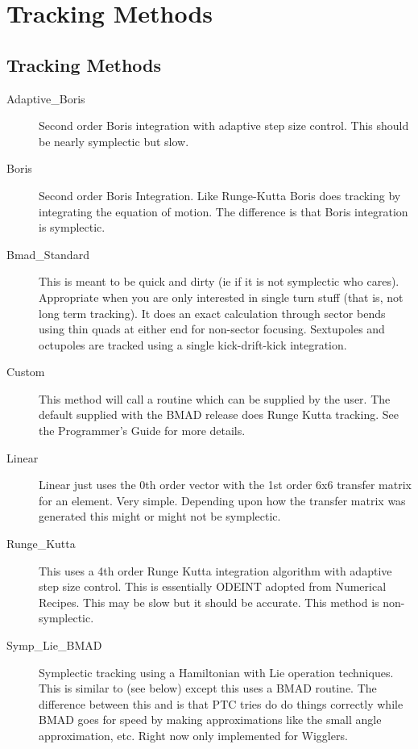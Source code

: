 \chapter{Tracking Methods}

\section{Tracking Methods}

\begin{description}
\item[Adaptive\_Boris]
Second order Boris integration with adaptive step size control.
This should be nearly symplectic but slow.

\item[Boris]
Second order Boris Integration. Like Runge-Kutta Boris does tracking by
integrating the equation of motion. The difference is that Boris integration
is symplectic.

\item[Bmad\_Standard]
This is meant to be quick and dirty (ie if it is not symplectic
who cares). Appropriate when you are only interested in single turn stuff
(that is, not long term tracking). It
does an exact calculation through sector bends using thin quads at either end
for non-sector focusing. Sextupoles and octupoles are tracked using a single
kick-drift-kick integration.

\item[Custom]
This method will call a routine  which can be supplied by
the user. The default  supplied with the BMAD release does
Runge Kutta tracking. See the Programmer's Guide for more details.

\item[Linear]
Linear just uses the 0th order vector with the 1st order 6x6 transfer
matrix for an element. Very simple.  Depending upon how the transfer
matrix was generated this might or might not be symplectic.

\item[Runge\_Kutta]
This uses a 4th order Runge Kutta integration algorithm with adaptive
step size control.  This is essentially ODEINT adopted from Numerical
Recipes. This may be slow but it should be accurate. This method is
non-symplectic.

\item[Symp\_Lie\_BMAD]
Symplectic tracking using a Hamiltonian with Lie operation techniques.
This is similar to  (see below) except this uses a
BMAD routine.  The difference between this and  is
that PTC tries do do things correctly while BMAD goes for speed by
making approximations like the small angle approximation, etc. Right
now only implemented for Wigglers.


\end{description}
